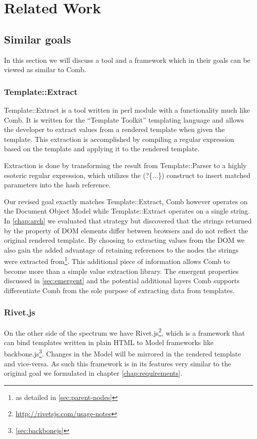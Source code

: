 \documentclass[thesis.tex]{subfiles}
\begin{document}
\chapter{Related Work}


\section{Similar goals}
In this section we will discuss a tool and a framework which in their goals
can be viewed as similar to Comb.

\subsection{Template::Extract}
Template::Extract\cite{TPLEXTRACT} is a tool written in perl module with a
functionality much like Comb. It is written for the ``Template Toolkit''
templating language and allows the developer to extract values from a rendered
template when given the template.
This extraction is accomplished by compiling a regular expression based on the
template and applying it to the rendered template.

\begin{citequote}{\cite{TPLEXTRACT}}
Extraction is done by transforming the result from Template::Parser to a highly
esoteric regular expression, which utilizes the (?\{...\}) construct to insert
matched parameters into the hash reference.
\end{citequote}

Our revised goal exactly matches Template::Extract, Comb however operates on the
Document Object Model while Template::Extract operates on a single string.
In \ref{chap:arch} we evaluated that strategy but discovered that the strings
returned by the  property of DOM elements differ between
browsers and do not reflect the original rendered template.
By choosing to extracting values from the DOM we also gain the added advantage
of retaining references to the nodes the strings were extracted from\footnote{
	as detailed in \ref{sec:parent-nodes}
}.
This additional piece of information allows Comb to become more than a simple
value extraction library. The emergent properties discussed in
\ref{sec:emergent} and the potential additional layers Comb supports
differentiate Comb from the sole purpose of extracting data from templates.

\subsection{Rivet.js}
On the other side of the spectrum we have Rivet.js\footnote{
\url{http://rivetsjs.com/usage-notes}}, which is a framework that
can bind templates written in plain HTML to Model frameworks like
backbone.js\footnote{\ref{sec:backbonejs}}. Changes in the Model will be
mirrored in the rendered template and vice-versa.
As such this framework is in its features very similar to the original goal we
formulated in chapter \ref{chap:requirements}.
\end{document}
